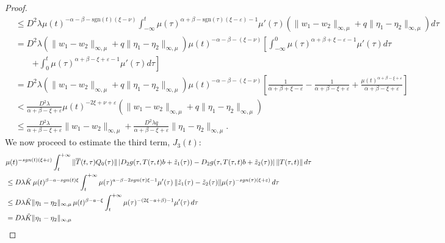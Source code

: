 \documentclass[10pt,a4paper]{amsart}
\begin{document}
\begin{proof}
{\begin{align*}
%
&\leq D^2 \lambda \mu(t)^{-\alpha - \beta - \text{sgn}(t)(\xi - \nu)} 
\int_{-\infty}^{t} 
  \mu(\tau)^{\alpha + \beta - \text{sgn}(\tau)(\xi - \varepsilon) - 1} \mu'(\tau) 
  \left( 
    \|w_1 - w_2\|_{\infty,\mu} + q \|\eta_1 - \eta_2\|_{\infty,\mu} 
  \right) d\tau \\
%
&= D^2 \lambda \left( 
    \|w_1 - w_2\|_{\infty,\mu} + q \|\eta_1 - \eta_2\|_{\infty,\mu} 
  \right) \mu(t)^{-\alpha - \beta - (\xi - \nu)} 
\left[
  \int_{-\infty}^{0} \mu(\tau)^{\alpha + \beta + \xi - \varepsilon - 1} \mu'(\tau) d\tau \right. \\
&\qquad\left. + \int_0^t \mu(\tau)^{\alpha + \beta - \xi + \varepsilon - 1} \mu'(\tau) d\tau
\right] \\
%
&= D^2 \lambda \left( 
    \|w_1 - w_2\|_{\infty,\mu} + q \|\eta_1 - \eta_2\|_{\infty,\mu} 
  \right) \mu(t)^{-\alpha - \beta - (\xi - \nu)} 
\left[
  \frac{1}{\alpha + \beta + \xi - \varepsilon} 
  - \frac{1}{\alpha + \beta - \xi + \varepsilon} 
  + \frac{\mu(t)^{\alpha + \beta - \xi + \varepsilon}}{\alpha + \beta - \xi + \varepsilon} 
\right] \\
%
&< \frac{D^2 \lambda}{\alpha + \beta - \xi + \varepsilon} 
   \mu(t)^{-2\xi + \nu + \varepsilon} 
   \left( 
     \|w_1 - w_2\|_{\infty,\mu} + q \|\eta_1 - \eta_2\|_{\infty,\mu} 
   \right) \\
%
&\leq \frac{D^2 \lambda}{\alpha + \beta - \xi + \varepsilon} 
      \|w_1 - w_2\|_{\infty,\mu} 
      + \frac{D^2 \lambda q}{\alpha + \beta - \xi + \varepsilon} 
      \|\eta_1 - \eta_2\|_{\infty,\mu}.
\end{align*}}
We now proceed to estimate the third term, \(J_3(t)\):
\begin{align*}
&\mu(t)^{-\textnormal{sgn}(t)(\xi + \varepsilon)} 
\int_t^{+\infty} 
  \|\overline{T}(t,\tau) Q_0(\tau)\| 
  \left| D_2g(\tau, T(\tau,t)b + \tilde{z}_1(\tau)) 
       - D_2g(\tau, T(\tau,t)b + \tilde{z}_2(\tau)) \right| 
  \|T(\tau,t)\| \, d\tau \\
%
&\leq D \lambda \tilde{K} \, \mu(t)^{\beta - a - \textnormal{sgn}(t)\xi} 
\int_t^{+\infty} 
  \mu(\tau)^{a - \beta - 2\textnormal{sgn}(\tau)\xi - 1} \mu'(\tau) \,
  \|\tilde{z}_1(\tau) - \tilde{z}_2(\tau)\| 
  \mu(\tau)^{-\textnormal{sgn}(\tau)(\xi + \varepsilon)} \, d\tau \\
%
&\leq D \lambda \tilde{K} \|\eta_1 - \eta_2\|_{\infty,\mu} 
    \, \mu(t)^{\beta - a - \xi} 
\int_t^{+\infty} 
    \mu(\tau)^{-(2\xi - a + \beta) - 1} \mu'(\tau) \, d\tau \\
%
&= D \lambda \tilde{K} \|\eta_1 - \eta_2\|_{\infty,\mu} 

\end{align*}
\end{proof}
\end{document}
